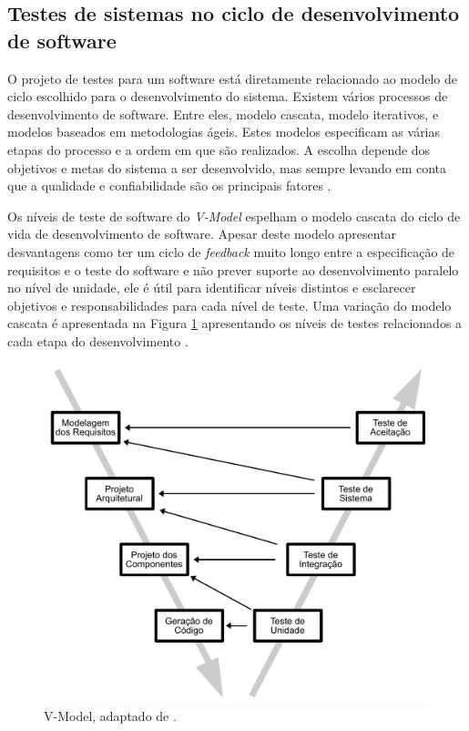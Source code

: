 \subsection{Testes de sistemas no ciclo de desenvolvimento de software}

O projeto de testes para um software está diretamente relacionado ao modelo de ciclo escolhido para o desenvolvimento do sistema. Existem vários processos de desenvolvimento de software. Entre eles, modelo cascata, modelo iterativos, e modelos baseados em metodologias ágeis.  Estes modelos especificam as várias etapas do processo e a ordem em que são realizados. A escolha  depende dos objetivos e metas do sistema a ser desenvolvido, mas sempre levando em conta que a qualidade e confiabilidade são os principais fatores \cite{graham2008foundations}.

Os níveis de teste de software do \textit{V-Model} espelham o modelo cascata do ciclo de vida de desenvolvimento de software. Apesar deste modelo apresentar desvantagens como ter um ciclo de \textit{feedback} muito longo entre a especificação de requisitos e o teste do software e não prever suporte ao desenvolvimento paralelo no nível de unidade, ele é útil para identificar níveis distintos e esclarecer objetivos e responsabilidades para cada nível de teste. Uma variação do modelo cascata é apresentada na Figura \ref{fig:v-model} apresentando os níveis de testes relacionados a cada etapa do desenvolvimento \cite{jorgensen2016software}. 
% 
% 

\begin{figure}[ht]
\centering
\includegraphics[scale=0.6]{imagens/v-model.pdf}
\caption{V-Model, adaptado de \cite{pressman2005software}.}
\label{fig:v-model}
\end{figure}

